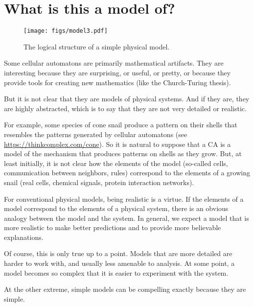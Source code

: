 \documentclass[12pt]{book}
\theoremstyle{exercise}
\begin{document}
\section{What is this a model of?}
\label{model3}

\begin{figure}
\centerline{\texttt{[image: figs/model3.pdf]}}
\caption{The logical structure of a simple physical model.}
\label{fig.model3}
\end{figure}

Some cellular automatons are primarily mathematical artifacts.  They are
interesting because they are surprising, or useful, or pretty, or
because they provide tools for creating new mathematics (like the
Church-Turing thesis).


But it is not clear that they are models of physical systems.  And if
they are, they are highly abstracted, which is to say that they are
not very detailed or realistic.


For example, some species of cone snail produce a pattern on their
shells that resembles the patterns generated by cellular automatons
(see \url{https://thinkcomplex.com/cone}).  So it is natural to
suppose that a CA is a model of the mechanism that produces patterns
on shells as they grow.  But, at least initially, it is not clear how
the elements of the model (so-called cells, communication between
neighbors, rules) correspond to the elements of a growing snail (real
cells, chemical signals, protein interaction networks).


For conventional physical models, being realistic is a virtue.  If the elements of a model correspond to the elements of a physical system, there is an obvious analogy between the model and the system.  In general, we expect a model that is more realistic to make better predictions and to provide more believable
explanations.


Of course, this is only true up to a point.  Models that are
more detailed are harder to work with, and usually less
amenable to analysis.  At some point, a model becomes so complex
that it is easier to experiment with the system.

At the other extreme, simple models can be compelling exactly because
they are simple.
\end{document}
